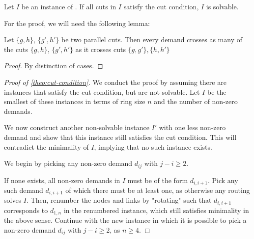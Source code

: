 \begin{theorem}
	\label{theo:cut-condition}
	Let $I$ be an instance of \RRL.
	If all cuts in $I$ satisfy the cut condition, $I$ is solvable.
\end{theorem}
For the proof, we will need the following lemma:
\begin{lemma}
	\label{lemma:parallel-diagonal-cuts}
	Let $\{g, h\}$, $\{g', h'\}$ be two parallel cuts.
	Then every demand crosses as many of the cuts $\{g, h\}$, $\{g', h'\}$ as it crosses cuts $\{g, g'\}, \{h, h'\}$
\end{lemma}
\begin{proof}
	By distinction of cases.
\end{proof}
\begin{proof}[Proof of \cref{theo:cut-condition}]
	We conduct the proof by assuming there are instances that satisfy the cut condition, but are not solvable.
	Let $I$ be the smallest of these instances in terms of ring size $n$ and the number of non-zero demands.
	
	We now construct another non-solvable instance $I'$ with one less non-zero demand and show that this instance still satisfies the cut condition.
	This will contradict the minimality of $I$, implying that no such instance exists.
	
 	We begin by picking any non-zero demand $d_{ij}$ with $j - i \geq 2$.
	
	If none exists, all non-zero demands in $I$ must be of the form $d_{i, i+1}$.
	Pick any such demand $d_{i, i+1}$ of which there must be at least one, as otherwise any routing solves $I$.
	Then, renumber the nodes and links by "rotating" such that $d_{i, i+1}$ corresponds to $d_{1, n}$ in the renumbered instance, which still satisfies minimality in the above sense.
	Continue with the new instance in which it is possible to pick a non-zero demand $d_{ij}$ with $j - i \geq 2$, as $n \geq 4$.
	

\end{proof}
